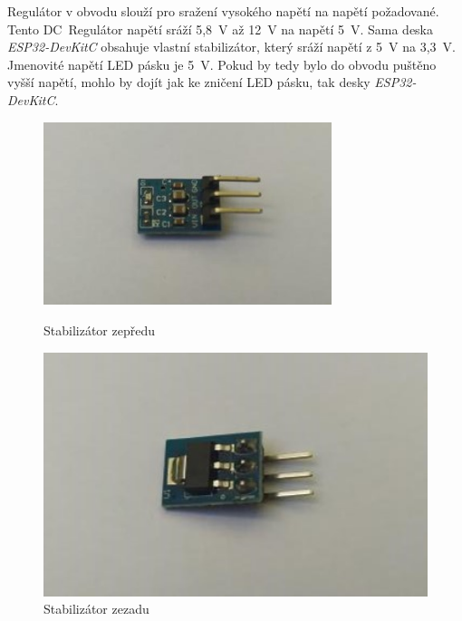 Regulátor v obvodu slouží pro sražení vysokého napětí na napětí požadované. Tento DC~Regulátor napětí\cite{DollaTek} sráží 5,8~V až 12~V na napětí 5~V. Sama deska \textit{ESP32-DevKitC} obsahuje vlastní stabilizátor, který sráží napětí z 5~V na 3,3~V. Jmenovité napětí LED pásku je 5~V. Pokud by tedy bylo do obvodu puštěno vyšší napětí, mohlo by dojít jak ke zničení LED pásku, tak desky \textit{ESP32-DevKitC}.



    \begin{figure}[htbp]
	\centering
	\begin{minipage}[b]{0.5\textwidth}
		\centering
		\includegraphics[width=0.75\textwidth]{img/02 ele/Stepdown front.jpg}
		\caption{Stabilizátor zepředu}
	\end{minipage}
	\qquad
	\begin{minipage}[b]{0.4\textwidth}
		\centering
		\includegraphics[width=1\textwidth]{img/02 ele/Stepdown back.jpg}
		\caption{Stabilizátor zezadu}
	\end{minipage}
\end{figure}


